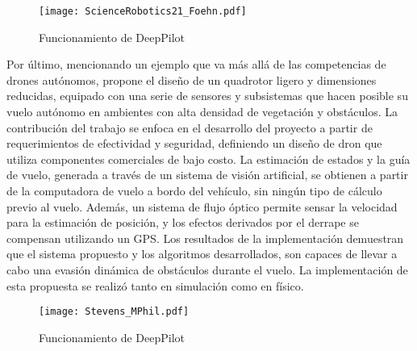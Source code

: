 \begin{figure}[ht]
    \centering
    \texttt{[image: ScienceRobotics21\_Foehn.pdf]}
    \caption{Funcionamiento de DeepPilot\citet{foehn2021time}}
    \label{fig:Foehn}
\end{figure}

Por último, mencionando un ejemplo que va más allá de las competencias de drones autónomos, \citet{stevens2021autonomous} propone el diseño de un quadrotor ligero y dimensiones reducidas, equipado con una serie de sensores y subsistemas que hacen posible su vuelo autónomo en ambientes con alta densidad de vegetación y obstáculos.  La contribución del trabajo se enfoca en el desarrollo del proyecto a partir de requerimientos de efectividad y seguridad, definiendo un diseño de dron que utiliza componentes comerciales de bajo costo. La estimación de estados y la guía de vuelo, generada a través de un sistema de visión artificial, se obtienen a partir de la computadora de vuelo a bordo del vehículo, sin ningún tipo de cálculo previo al vuelo. Además, un sistema de flujo óptico permite sensar la velocidad para la estimación de posición, y los efectos derivados por el derrape se compensan utilizando un GPS.
Los resultados de la implementación demuestran que el sistema propuesto y los algoritmos desarrollados, son capaces de llevar a cabo una evasión dinámica de obstáculos durante el vuelo. La implementación de esta propuesta se realizó tanto en simulación como en físico. 


\begin{figure}[ht]
    \centering
    \texttt{[image: Stevens\_MPhil.pdf]}
    \caption{Funcionamiento de DeepPilot\citet{stevens2021autonomous}}
    \label{fig:Stevens}
\end{figure}